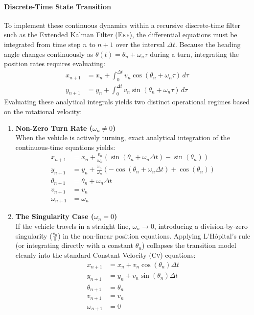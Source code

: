 \paragraph{Discrete-Time State Transition}
To implement these continuous dynamics within a recursive discrete-time filter such as the Extended Kalman Filter (\textsc{Ekf}), the differential equations must be integrated from time step $n$ to $n+1$ over the interval $\Delta t$. Because the heading angle changes continuously as $\theta(t) = \theta_n + \omega_n \tau$ during a turn, integrating the position rates requires evaluating:
\begin{align}
	x_{n+1} &= x_n + \int_0^{\Delta t} v_n \cos(\theta_n + \omega_n \tau) \, d\tau \\
	y_{n+1} &= y_n + \int_0^{\Delta t} v_n \sin(\theta_n + \omega_n \tau) \, d\tau
\end{align}
Evaluating these analytical integrals yields two distinct operational regimes based on the rotational velocity:


\begin{enumerate}[label=\textbf{Case \Alph*:}, leftmargin=*, itemsep=1em]
	
	\item \textbf{Non-Zero Turn Rate ($\omega_n \neq 0$)}\\
	When the vehicle is actively turning, exact analytical integration of the continuous-time equations yields:
	\begin{align}
		x_{n+1} &= x_n + \frac{v_n}{\omega_n} \left( \sin(\theta_n + \omega_n \Delta t) - \sin(\theta_n) \right) \\
		y_{n+1} &= y_n + \frac{v_n}{\omega_n} \left( -\cos(\theta_n + \omega_n \Delta t) + \cos(\theta_n) \right) \\
		\theta_{n+1} &= \theta_n + \omega_n \Delta t \\
		v_{n+1} &= v_n \\
		\omega_{n+1} &= \omega_n
	\end{align}
	
	\item \textbf{The Singularity Case ($\omega_n = 0$)}\\
	If the vehicle travels in a straight line, $\omega_n \to 0$, introducing a division-by-zero singularity ($\frac{v_n}{0}$) in the non-linear position equations. Applying L'H\^{o}pital's rule (or integrating directly with a constant $\theta_n$) collapses the transition model cleanly into the standard Constant Velocity (\textsc{Cv}) equations:
	\begin{align}
		x_{n+1} &= x_n + v_n \cos(\theta_n) \Delta t \\
		y_{n+1} &= y_n + v_n \sin(\theta_n) \Delta t \\
		\theta_{n+1} &= \theta_n \\
		v_{n+1} &= v_n \\
		\omega_{n+1} &= 0
	\end{align}
	
\end{enumerate}

